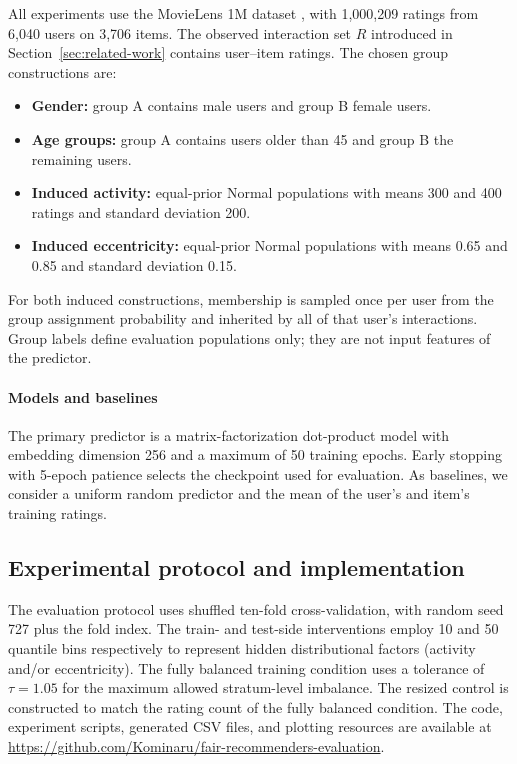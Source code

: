 \documentclass[11pt]{article}
\begin{document}
All experiments use the MovieLens 1M dataset \cite{harper2015}, with 1,000,209 ratings from 6,040 users on 3,706 items. The observed
interaction set $R$ introduced in Section~\ref{sec:related-work} contains
user--item ratings. The chosen group constructions are:
\begin{itemize}
    \item \textbf{Gender:} group A contains male users and group B
    female users.
    \item \textbf{Age groups:} group A contains users older than 45 and group
    B the remaining users.
    \item \textbf{Induced activity:} equal-prior Normal populations
    with means 300 and 400 ratings and standard deviation 200.
    \item \textbf{Induced eccentricity:} equal-prior Normal
    populations with means 0.65 and 0.85 and standard deviation 0.15.
\end{itemize}
For both induced constructions, membership is sampled once per user from the
group assignment probability and inherited by all of that user's
interactions. Group labels define evaluation
populations only; they are not input features of the predictor.

\paragraph{Models and baselines}

The primary predictor is a matrix-factorization dot-product model with embedding dimension
256 and a maximum of 50 training epochs. Early stopping with 5-epoch patience selects the checkpoint
used for evaluation. As baselines, we consider a uniform random predictor and the mean of the user's and item's training ratings.

\subsection{Experimental protocol and implementation}

The evaluation protocol uses shuffled ten-fold cross-validation, with random seed 727 plus the fold index. The train- and test-side interventions employ 10 and 50 quantile bins respectively to represent hidden distributional factors (activity and/or eccentricity). The fully balanced training condition uses a tolerance of $\tau=1.05$ for the maximum allowed stratum-level imbalance. The resized control is constructed to match the rating count of the fully balanced condition.
The code, experiment scripts, generated CSV files, and plotting resources are
available at \url{https://github.com/Kominaru/fair-recommenders-evaluation}.
\end{document}
